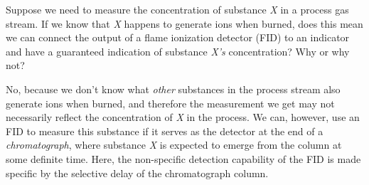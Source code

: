 

Suppose we need to measure the concentration of substance {\it X} in a process gas stream.  If we know that {\it X} happens to generate ions when burned, does this mean we can connect the output of a flame ionization detector (FID) to an indicator and have a guaranteed indication of substance {\it X's} concentration?  Why or why not?







No, because we don't know what {\it other} substances in the process stream also generate ions when burned, and therefore the measurement we get may not necessarily reflect the concentration of {\it X} in the process.  We can, however, use an FID to measure this substance if it serves as the detector at the end of a {\it chromatograph}, where substance {\it X} is expected to emerge from the column at some definite time.  Here, the non-specific detection capability of the FID is made specific by the selective delay of the chromatograph column.











